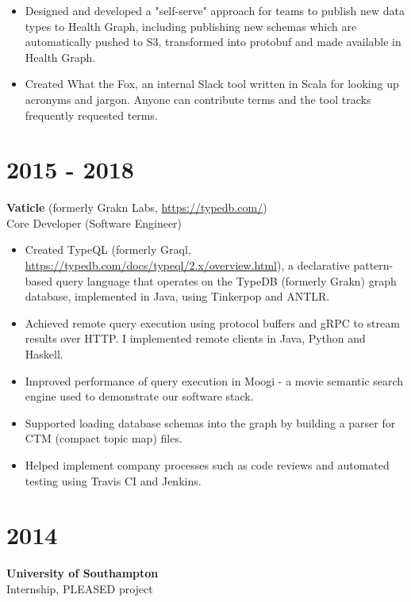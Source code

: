 \documentclass[margin]{res}
\begin{document}
\begin{resume}
\begin{itemize}
\item
Designed and developed a "self-serve" approach for teams to publish new data types to Health Graph, including publishing new schemas which are automatically pushed to S3, transformed into protobuf and made available in Health Graph.

\item
Created What the Fox, an internal Slack tool written in Scala for looking up acronyms and jargon. Anyone can contribute terms and the tool tracks frequently requested terms.

\end{itemize}

\normalsize{\section{2015 - 2018}}
{\bf Vaticle} (formerly Grakn Labs, \href{https://typedb.com/}{https://typedb.com/}) \\
Core Developer (Software Engineer)
\begin{itemize}

\item
Created TypeQL (formerly Graql, \href{https://typedb.com/docs/typeql/2.x/overview.html}{https://typedb.com/docs/typeql/2.x/overview.html}), a declarative pattern-based query language that operates on the TypeDB (formerly Grakn) graph database, implemented in Java, using Tinkerpop and ANTLR.

\item
Achieved remote query execution using protocol buffers and gRPC to stream results over HTTP. I implemented remote clients in Java, Python and Haskell.

\item
Improved performance of query execution in Moogi - a movie semantic search engine used to demonstrate our software stack.

\item
Supported loading database schemas into the graph by building a parser for CTM (compact topic map) files.

\item
Helped implement company processes such as code reviews and automated testing using Travis CI and Jenkins.

\end{itemize}

\normalsize{\section{2014}}
{\bf University of Southampton} \\
Internship, PLEASED project


\end{resume}
\end{document}
